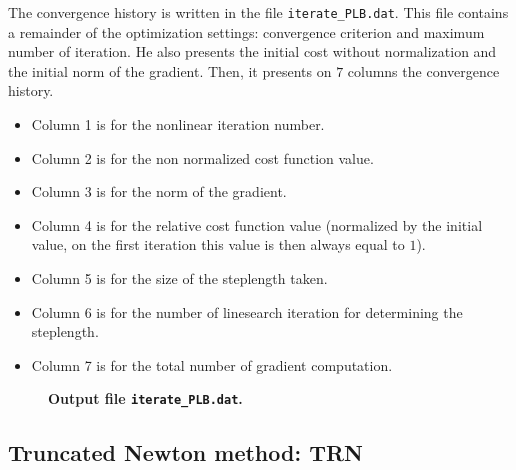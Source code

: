 \documentclass[a4paper,twoside,final,onecolumn,11pt,openright]{article}
\begin{document}
The convergence history is written in the file \texttt{iterate\_PLB.dat}. This file contains a remainder of the optimization settings: convergence criterion and maximum number of iteration. He also presents the initial cost without normalization and the initial norm of the gradient. Then, it presents on $7$ columns the convergence history. 
\begin{itemize}
\item Column 1 is for the nonlinear iteration number.
\item Column 2 is for the non normalized cost function value.
\item Column 3 is for the norm of the gradient.
\item Column 4 is for the relative cost function value (normalized by the initial value, on the first iteration this value is then always equal to $1$).
\item Column 5 is for the size of the steplength taken.
\item Column 6 is for the number of linesearch iteration for determining the steplength.
\item Column 7 is for the total number of gradient computation.
\end{itemize}

\begin{figure}
\tiny
 
\normalsize
\begin{center}
\textbf{Output file \texttt{iterate\_PLB.dat}.} 
\end{center}
 \end{figure}


\newpage
\subsection{Truncated Newton method: TRN}
\end{document}
